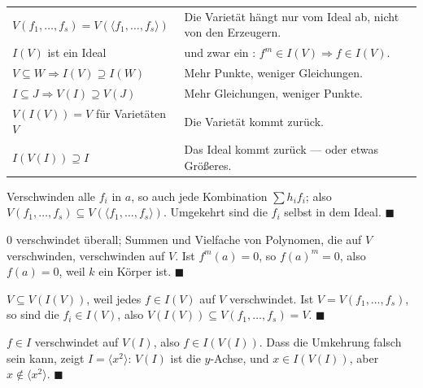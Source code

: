 \begin{merksatz}
\begin{center}
{\small
\renewcommand{\arraystretch}{1.5}
\begin{tabular}{@{}P{3.4cm}P{5.2cm}@{}}
\toprule
$V(f_1, \ldots, f_s) = V(\langle f_1, \ldots, f_s\rangle)$ & Die Varietät hängt nur vom Ideal ab, nicht von den Erzeugern.\\
$I(V)$ ist ein Ideal & und zwar ein : $f^{m}\in I(V)\Rightarrow f\in I(V)$.\\
$V\subseteq W \Rightarrow I(V)\supseteq I(W)$ & Mehr Punkte, weniger Gleichungen.\\
$I\subseteq J \Rightarrow V(I)\supseteq V(J)$ & Mehr Gleichungen, weniger Punkte.\\
$V(I(V)) = V$ für Varietäten $V$ & Die Varietät kommt zurück.\\
$I(V(I))\supseteq I$ & Das Ideal kommt zurück --- oder etwas Größeres.\\
\bottomrule
\end{tabular}}
\end{center}

Verschwinden alle $f_i$ in $a$, so auch jede Kombination $\sum h_if_i$; also $V(f_1, \ldots, f_s)\subseteq V(\langle f_1, \ldots, f_s\rangle)$. Umgekehrt sind die $f_i$ selbst in dem Ideal. $\blacksquare$

$0$ verschwindet überall; Summen und Vielfache von Polynomen, die auf $V$ verschwinden, verschwinden auf $V$. Ist $f^{m}(a) = 0$, so $f(a)^{m} = 0$, also $f(a) = 0$, weil $k$ ein Körper ist. $\blacksquare$

$V\subseteq V(I(V))$, weil jedes $f\in I(V)$ auf $V$ verschwindet. Ist $V = V(f_1, \ldots, f_s)$, so sind die $f_i\in I(V)$, also $V(I(V))\subseteq V(f_1, \ldots, f_s) = V$. $\blacksquare$

$f\in I$ verschwindet auf $V(I)$, also $f\in I(V(I))$. Dass die Umkehrung falsch sein kann, zeigt $I = \langle x^{2}\rangle$: $V(I)$ ist die $y$-Achse, und $x\in I(V(I))$, aber $x\notin\langle x^{2}\rangle$. $\blacksquare$

\begin{center}
\begin{minipage}{0.88\textwidth}
\end{minipage}
\end{center}
\end{merksatz}

